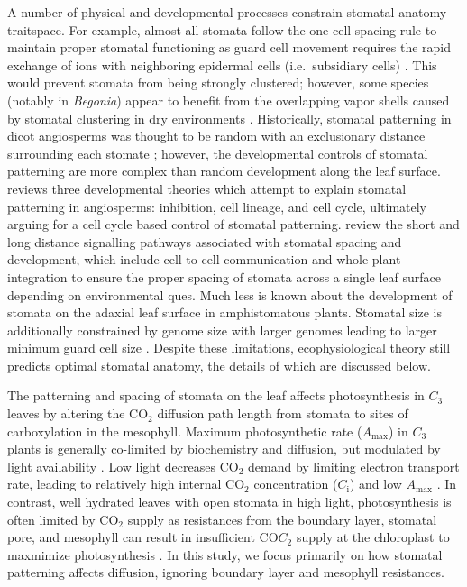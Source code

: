 \documentclass[webpdf,large,modern,unnumsec,namedate]{oup-authoring-template}
\begin{document}
A number of physical and developmental processes constrain stomatal
anatomy traitspace. For example, almost all stomata follow the one cell
spacing rule to maintain proper stomatal functioning as guard cell
movement requires the rapid exchange of ions with neighboring epidermal
cells (i.e.~subsidiary cells)
\citep{geisler_oriented_2000, dow_physiological_2014}. This would
prevent stomata from being strongly clustered; however, some species
(notably in \emph{Begonia}) appear to benefit from the overlapping vapor
shells caused by stomatal clustering in dry environments
\citep{yi_gan_stomatal_2010, lehmann_effects_2015, papanatsiou_stomatal_2017}.
Historically, stomatal patterning in dicot angiosperms was thought to be
random with an exclusionary distance surrounding each stomate
\citep{sachs_developmental_1974}; however, the developmental controls of
stomatal patterning are more complex than random development along the
leaf surface. \citet{croxdale_stomatal_2000} reviews three developmental
theories which attempt to explain stomatal patterning in angiosperms:
inhibition, cell lineage, and cell cycle, ultimately arguing for a cell
cycle based control of stomatal patterning.
\citet{pillitteri_mechanisms_2012} review the short and long distance
signalling pathways associated with stomatal spacing and development,
which include cell to cell communication and whole plant integration to
ensure the proper spacing of stomata across a single leaf surface
depending on environmental ques. Much less is known about the
development of stomata on the adaxial leaf surface in amphistomatous
plants. Stomatal size is additionally constrained by genome size with
larger genomes leading to larger minimum guard cell size
\citep{jordan_environmental_2015}. Despite these limitations,
ecophysiological theory still predicts optimal stomatal anatomy, the
details of which are discussed below.

The patterning and spacing of stomata on the leaf affects photosynthesis
in \(C_3\) leaves by altering the CO\(_2\) diffusion path length from
stomata to sites of carboxylation in the mesophyll. Maximum
photosynthetic rate (\(A_\text{max}\)) in \(C_3\) plants is generally
co-limited by biochemistry and diffusion, but modulated by light
availability
\citep{parkhurst_intercellular_1990, manter_ci_2004, carriqui_diffusional_2015}.
Low light decreases CO\(_2\) demand by limiting electron transport rate,
leading to relatively high internal CO\(_2\) concentration
(\(C_\text{i}\)) and low \(A_\text{max}\) \citep{kaiser_metabolic_2016}.
In contrast, well hydrated leaves with open stomata in high light,
photosynthesis is often limited by CO\(_2\) supply as resistances from
the boundary layer, stomatal pore, and mesophyll can result in
insufficient CO\(C_2\) supply at the chloroplast to maxmimize
photosynthesis \citep{farquhar_biochemical_1980, lehmeier_cell_2017}. In
this study, we focus primarily on how stomatal patterning affects
diffusion, ignoring boundary layer and mesophyll resistances.
\end{document}
